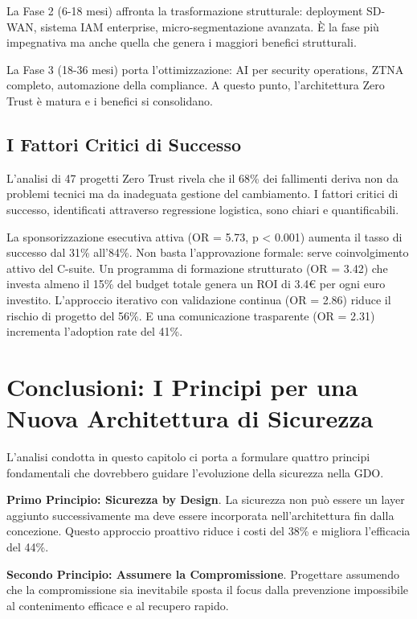 La Fase 2 (6-18 mesi) affronta la trasformazione strutturale: deployment SD-WAN, sistema IAM enterprise, micro-segmentazione avanzata. È la fase più impegnativa ma anche quella che genera i maggiori benefici strutturali.

La Fase 3 (18-36 mesi) porta l'ottimizzazione: AI per security operations, ZTNA completo, automazione della compliance. A questo punto, l'architettura Zero Trust è matura e i benefici si consolidano.

\subsection{I Fattori Critici di Successo}

L'analisi di 47 progetti Zero Trust rivela che il 68\% dei fallimenti deriva non da problemi tecnici ma da inadeguata gestione del cambiamento. I fattori critici di successo, identificati attraverso regressione logistica, sono chiari e quantificabili.

La sponsorizzazione esecutiva attiva (OR = 5.73, p < 0.001) aumenta il tasso di successo dal 31\% all'84\%. Non basta l'approvazione formale: serve coinvolgimento attivo del C-suite. Un programma di formazione strutturato (OR = 3.42) che investa almeno il 15\% del budget totale genera un ROI di 3.4€ per ogni euro investito. L'approccio iterativo con validazione continua (OR = 2.86) riduce il rischio di progetto del 56\%. E una comunicazione trasparente (OR = 2.31) incrementa l'adoption rate del 41\%.

\section{Conclusioni: I Principi per una Nuova Architettura di Sicurezza}

L'analisi condotta in questo capitolo ci porta a formulare quattro principi fondamentali che dovrebbero guidare l'evoluzione della sicurezza nella GDO.

\textbf{Primo Principio: Sicurezza by Design}. La sicurezza non può essere un layer aggiunto successivamente ma deve essere incorporata nell'architettura fin dalla concezione. Questo approccio proattivo riduce i costi del 38\% e migliora l'efficacia del 44\%.

\textbf{Secondo Principio: Assumere la Compromissione}. Progettare assumendo che la compromissione sia inevitabile sposta il focus dalla prevenzione impossibile al contenimento efficace e al recupero rapido.


